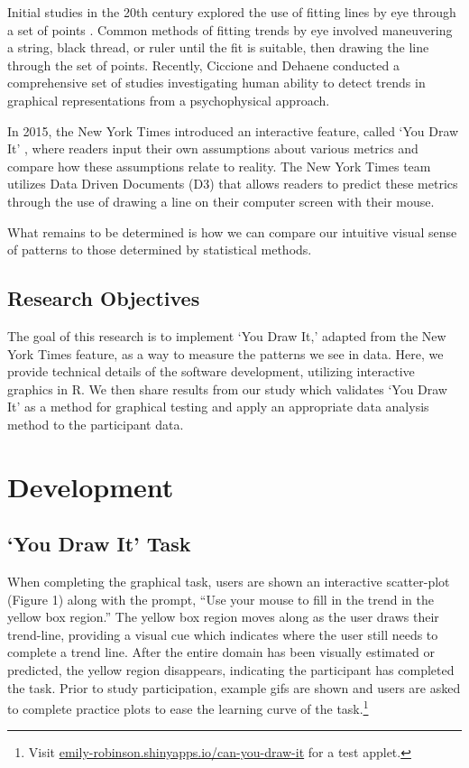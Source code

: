 \documentclass[10pt]{article}
\begin{document}
Initial studies in the 20th century explored the use of fitting lines by
eye through a set of points
\cite{finney1951subjective,mosteller1981eye}. Common methods of fitting
trends by eye involved maneuvering a string, black thread, or ruler
until the fit is suitable, then drawing the line through the set of
points. Recently, Ciccione and Dehaene 
conducted a comprehensive set of studies investigating human ability to
detect trends in graphical representations from a psychophysical
approach.

In 2015, the New York Times introduced an interactive feature, called
`You Draw It' \cite{aisch2015you}, where readers input their own
assumptions about various metrics and compare how these assumptions
relate to reality. The New York Times team utilizes Data Driven
Documents (D3) that allows readers to predict these metrics through the
use of drawing a line on their computer screen with their mouse.

What remains to be determined is how we can compare our intuitive visual
sense of patterns to those determined by statistical methods.

\subsection{Research Objectives}

The goal of this research is to implement `You Draw It,' adapted from
the New York Times feature, as a way to measure the patterns we see in
data. Here, we provide technical details of the software development,
utilizing interactive graphics in R. We then share results from our
study which validates `You Draw It' as a method for graphical testing
and apply an appropriate data analysis method to the participant data.

\section{Development}

\subsection{`You Draw It' Task}

When completing the graphical task, users are shown an interactive
scatter-plot (Figure 1) along with the prompt, ``Use your mouse to fill
in the trend in the yellow box region.'' The yellow box region moves
along as the user draws their trend-line, providing a visual cue which
indicates where the user still needs to complete a trend line. After the
entire domain has been visually estimated or predicted, the yellow
region disappears, indicating the participant has completed the task.
Prior to study participation, example gifs are shown and users are asked
to complete practice plots to ease the learning curve of the
task.\footnote{Visit \url{emily-robinson.shinyapps.io/can-you-draw-it}
  for a test applet.}
\end{document}
